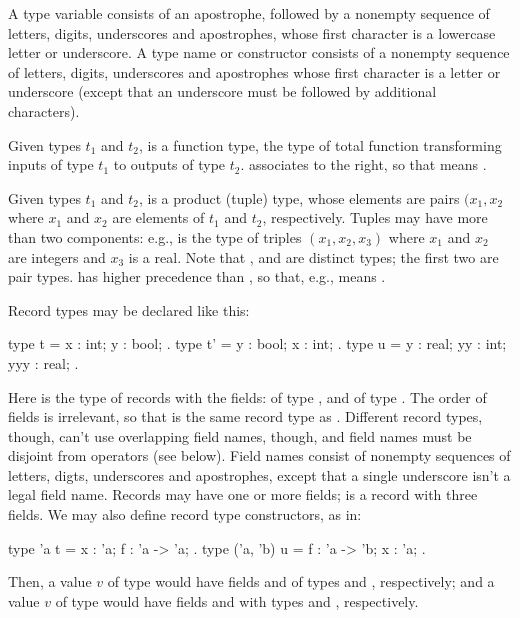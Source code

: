 A type variable consists of an apostrophe, followed by a nonempty
sequence of letters, digits, underscores and apostrophes, whose first
character is a lowercase letter or underscore. A type name or
constructor consists of a nonempty sequence of letters, digits,
underscores and apostrophes whose first character is a letter or
underscore (except that an underscore must be followed by additional
characters).

Given types $t_1$ and $t_2$,  is a function type,
the type of total function transforming inputs of type $t_1$ to
outputs of type $t_2$. \ec{->} associates to the right, so that
 means .

Given types $t_1$ and $t_2$,  is a product (tuple)
type, whose elements are pairs $(x_1, x_2$ where $x_1$ and $x_2$ are
elements of $t_1$ and $t_2$, respectively. Tuples may have more than
two components: e.g.,  is the type of triples
$(x_1, x_2, x_3)$ where $x_1$ and $x_2$ are integers and $x_3$ is a real.
Note that ,  and
 are distinct types; the first two are pair types.
\ec{*} has higher precedence than \ec{->}, so that, e.g.,
 means .

Record types may be declared like this:
\begin{easycrypt}{}{}
  type t = { x : int; y : bool; }.
  type t' = { y : bool; x : int; }.
  type u = { y : real; yy : int; yyy : real; }.
\end{easycrypt}
Here  is the type of records with the fields:  of type
, and  of type . The order of fields is
irrelevant, so that  is the same record type as
. Different record types, though, can't use overlapping field
names, though, and field names must be disjoint from operators (see
below). Field names consist of nonempty sequences of letters, digts,
underscores and apostrophes, except that a single underscore isn't a
legal field name.  Records may have one or more fields;  is a
record with three fields. We may also define record type constructors,
as in:
\begin{easycrypt}{}{}
  type 'a t = { x : 'a; f : 'a -> 'a; }.
  type ('a, 'b) u = { f : 'a -> 'b; x : 'a; }.
\end{easycrypt}
Then, a value $v$ of type  would have fields  and
 of types  and , respectively; and
a value $v$ of type  would have fields  and
 with types  and , respectively.

